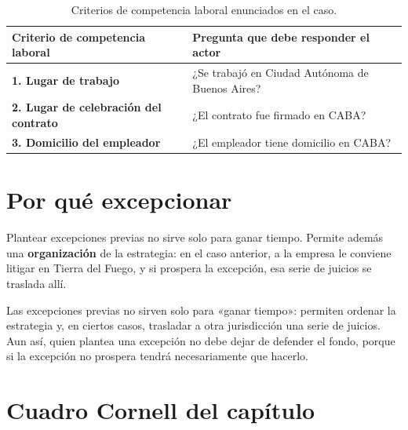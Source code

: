 \documentclass[12pt,oneside]{book}
\begin{document}
\begin{table}[H]
\centering
\small
\begin{tabularx}{\textwidth}{>{\raggedright\arraybackslash}p{} >{\raggedright\arraybackslash}X}
\toprule
\textbf{Criterio de competencia laboral} & \textbf{Pregunta que debe responder el actor} \\
\midrule
\textbf{1. Lugar de trabajo} & ¿Se trabajó en Ciudad Autónoma de Buenos Aires? \\
\textbf{2. Lugar de celebración del contrato} & ¿El contrato fue firmado en CABA? \\
\textbf{3. Domicilio del empleador} & ¿El empleador tiene domicilio en CABA? \\
\bottomrule
\end{tabularx}
\caption{Criterios de competencia laboral enunciados en el caso.}
\end{table}

\section{Por qué excepcionar}

Plantear excepciones previas no sirve solo para ganar tiempo. Permite además una \textbf{organización} de la estrategia: en el caso anterior, a la empresa le conviene litigar en Tierra del Fuego, y si prospera la excepción, esa serie de juicios se traslada allí.

\begin{important}
Las excepciones previas no sirven solo para «ganar tiempo»: permiten ordenar la estrategia y, en ciertos casos, trasladar a otra jurisdicción una serie de juicios. Aun así, quien plantea una excepción no debe dejar de defender el fondo, porque si la excepción no prospera tendrá necesariamente que hacerlo.
\end{important}

\section{Cuadro Cornell del capítulo}
\end{document}
